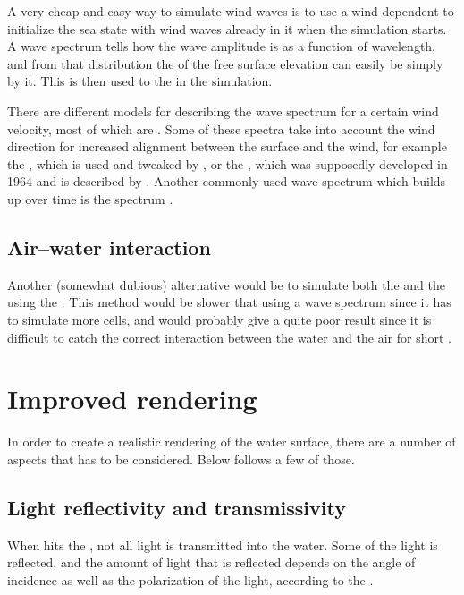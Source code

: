 A very cheap and easy way to simulate wind waves is to use a wind dependent  to initialize the sea state with wind waves already in it when the simulation starts. A wave spectrum tells how the wave amplitude is \distributed as a function of wavelength, and from that distribution the  of the free surface elevation can easily be \generated simply by \sampling it. This is then used to \initialize the  in the simulation.

There are different models for describing the wave spectrum for a certain wind velocity, most of which are \empirical. Some of these spectra take into account the wind direction for increased alignment between the surface and the wind, for example the , which is used and tweaked by \citet{Tessendorf2001}, or the , which was supposedly developed in 1964 and is described by \citet{Premovze2001}. Another commonly used wave spectrum which builds up over time is the \JONSWAP spectrum \citep{Journee2001b,WikiWaves2013}.

\subsection{Air--water interaction}

Another (somewhat dubious) alternative would be to simulate both the \water and the \air using the \FVM. This method would be slower that using a wave spectrum since it has to simulate more cells, and would probably give a quite poor result since it is difficult to catch the correct interaction between the water and the air for short \wavelengths.

\section{Improved rendering}

In order to create a realistic rendering of the water surface, there are a number of aspects that has to be considered. Below follows a few of those.

\subsection{Light reflectivity and transmissivity}

When \light hits the , not all light is transmitted into the water. Some of the light is reflected, and the amount of light that is reflected depends on the angle of incidence as well as the polarization of the light, according to the .

